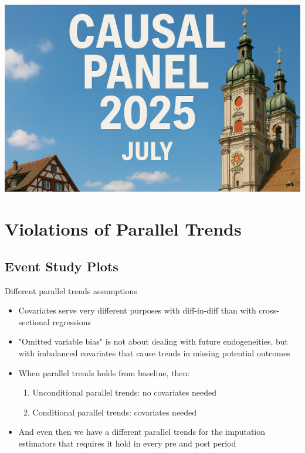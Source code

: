 \documentclass{beamer}
\begin{document}
\begin{frame}[plain]  %
\vfill
\begin{center}
  \includegraphics[width=0.85\linewidth]{./lecture_includes/banner_cropped}
\end{center}
\vfill
\end{frame}





\section{Violations of Parallel Trends}

\subsection{Event Study Plots}

\begin{frame}{Different parallel trends assumptions}

\begin{itemize}
\item Covariates serve very different purposes with diff-in-diff than with cross-sectional regressions
\item "Omitted variable bias" is not about dealing with future endogeneities, but with imbalanced covariates that cause trends in missing potential outcomes\item When parallel trends holds from baseline, then:
	\begin{enumerate}
	\item Unconditional parallel trends: no covariates needed
	\item Conditional parallel trends: covariates needed
	\end{enumerate}
\item And even then we have a different parallel trends for the imputation estimators that requires it hold in every pre and post period
\end{itemize}
\end{frame}
\end{document}
